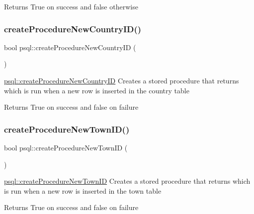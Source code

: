 \begin{DoxyReturn}{Returns}
True on success and false otherwise 
\end{DoxyReturn}
\mbox{\label{classpsql_a565bfc828ecb6b5621354128773494fd}} 
\subsubsection{\texorpdfstring{create\+Procedure\+New\+Country\+I\+D()}{createProcedureNewCountryID()}}
{\footnotesize\ttfamily bool psql\+::create\+Procedure\+New\+Country\+ID (\begin{DoxyParamCaption}{ }\end{DoxyParamCaption})}



\mbox{\hyperlink{classpsql_a565bfc828ecb6b5621354128773494fd}{psql\+::create\+Procedure\+New\+Country\+ID}} Creates a stored procedure that returns which is run when a new row is inserted in the country table 

\begin{DoxyReturn}{Returns}
True on success and false on failure 
\end{DoxyReturn}
\mbox{\label{classpsql_ade0c7fa4f019c3f349230af09b1de49e}} 
\subsubsection{\texorpdfstring{create\+Procedure\+New\+Town\+I\+D()}{createProcedureNewTownID()}}
{\footnotesize\ttfamily bool psql\+::create\+Procedure\+New\+Town\+ID (\begin{DoxyParamCaption}{ }\end{DoxyParamCaption})}



\mbox{\hyperlink{classpsql_ade0c7fa4f019c3f349230af09b1de49e}{psql\+::create\+Procedure\+New\+Town\+ID}} Creates a stored procedure that returns which is run when a new row is inserted in the town table 

\begin{DoxyReturn}{Returns}
True on success and false on failure 
\end{DoxyReturn}
\mbox{\label{classpsql_a28f3e3d6309e3ce57493db284c099946}} 
